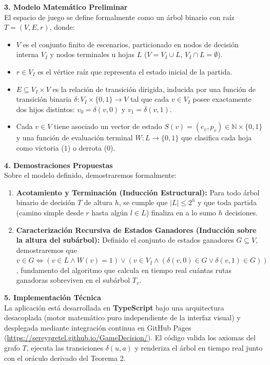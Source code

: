 \documentclass[11pt,letterpaper]{article}
\begin{document}
\textbf{3. Modelo Matemático Preliminar} \\
El espacio de juego se define formalmente como un árbol binario con raíz $T = (V, E, r)$, donde:
\begin{itemize}[noitemsep, topsep=1pt]
    \item $V$ es el conjunto finito de escenarios, particionado en nodos de decisión interna $V_I$ y nodos terminales u hojas $L$ ($V = V_I \cup L$, $V_I \cap L = \emptyset$).
    \item $r \in V_I$ es el vértice raíz que representa el estado inicial de la partida.
    \item $E \subseteq V_I \times V$ es la relación de transición dirigida, inducida por una función de transición binaria $\delta: V_I \times \{0, 1\} \to V$ tal que cada $v \in V_I$ posee exactamente dos hijos distintos: $v_0 = \delta(v, 0)$ y $v_1 = \delta(v, 1)$.
    \item Cada $v \in V$ tiene asociado un vector de estado $S(v) = (e_v, p_v) \in \mathbb{N} \times \{0, 1\}$ y una función de evaluación terminal $W: L \to \{0, 1\}$ que clasifica cada hoja como victoria ($1$) o derrota ($0$).
\end{itemize}

\textbf{4. Demostraciones Propuestas} \\
Sobre el modelo definido, demostraremos formalmente:
\begin{enumerate}[noitemsep, topsep=1pt]
    \item \textbf{Acotamiento y Terminación (Inducción Estructural):} Para todo árbol binario de decisión $T$ de altura $h$, se cumple que $|L| \leq 2^h$ y que toda partida (camino simple desde $r$ hasta algún $l \in L$) finaliza en a lo sumo $h$ decisiones.
    \item \textbf{Caracterización Recursiva de Estados Ganadores (Inducción sobre la altura del subárbol):} Definido el conjunto de estados ganadores $G \subseteq V$, demostraremos que $v \in G \iff (v \in L \land W(v) = 1) \lor (v \in V_I \land (\delta(v,0) \in G \lor \delta(v,1) \in G))$, fundamento del algoritmo que calcula en tiempo real cuántas rutas ganadoras sobreviven en el subárbol $T_v$.
\end{enumerate}

\textbf{5. Implementación Técnica} \\
La aplicación está desarrollada en \textbf{TypeScript} bajo una arquitectura desacoplada (motor matemático puro independiente de la interfaz visual) y desplegada mediante integración continua en GitHub Pages (\url{https://sereypretel.github.io/GameDecision/}). El código valida los axiomas del grafo $T$, ejecuta las transiciones $\delta(u,a)$ y renderiza el árbol en tiempo real junto con el oráculo derivado del Teorema 2.
\end{document}
